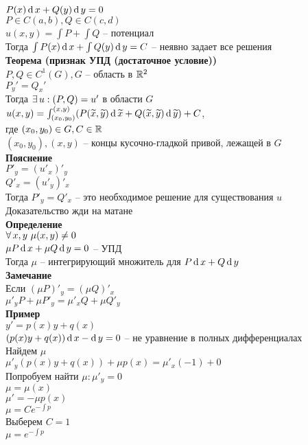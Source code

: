 \documentclass[12pt]{article}
\begin{document}
$P(x)\operatorname{d} x + Q(y)\operatorname{d} y = 0$\\
$P \in C(a, b), Q \in C(c, d)$\\
$u(x, y) = \int P + \int Q$ -- потенциал\\
Тогда $\int P(x)\operatorname{d} x + \int Q(y) \operatorname{d} y = C$ -- неявно задает все решения\\
\textbf{Теорема (признак УПД (достаточное условие))}\\
$P, Q \in C^1(G), G$ -- область в $\mathbb{R}^2$\\
$P_y' = Q_x'$\\
Тогда $\exists\, u: (P, Q) = u'$ в области $G$\\
$u(x,y) = \int_{(x_0, y_0)}^{(x,y)} (P(\widetilde x, \widetilde y)\operatorname{d} \widetilde x + Q(\widetilde x, \widetilde y)\operatorname{d} \widetilde y) + C$,\\
где $(x_0, y_0) \in G, C \in \mathbb{R}$\\
$(x_0, y_0), (x,y)$ -- концы кусочно-гладкой привой, лежащей в $G$\\
\textbf{Пояснение}\\
$P'_y = (u'_x)'_y$\\
$Q'_x = (u'_y)'_x$\\
Тогда $P'_y = Q'_x$ -- это необходимое решение для существования $u$\\
Доказательство жди на матане\\
\textbf{Определение}\\
$\forall\, x, y\ \mu(x, y) \neq 0$\\
$\mu P\operatorname{d} x + \mu Q \operatorname{d} y = 0$ -- УПД\\
Тогда $\mu$ -- интегрирующий множитель для $P\operatorname{d} x + Q\operatorname{d} y$\\
\textbf{Замечание}\\
Если $(\mu P)'_y = (\mu Q)'_x$\\
$\mu'_y P + \mu P'_y = \mu'_x Q + \mu Q'_y$\\
\textbf{Пример}\\
$y' = p(x)y + q(x)$\\
$(p(x)y + q(x))\operatorname{d} x - \operatorname{d} y = 0$ -- не уравнение в полных дифференциалах\\
Найдем $\mu$\\
$\mu'_y(p(x)y+q(x)) + \mu p(x) = \mu'_x(-1) + 0$\\
Попробуем найти $\mu: \mu'_y = 0$\\
$\mu = \mu(x)$\\
$\mu' = -\mu p(x)$\\
$\mu = Ce^{-\int p}$\\
Выберем $C = 1$\\
$\mu = e^{-\int p}$
\end{document}

